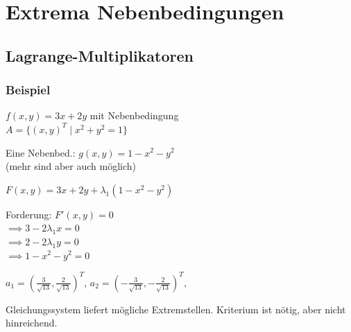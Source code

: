 \section*{Extrema Nebenbedingungen}

\subsection*{Lagrange-Multiplikatoren}
\subsubsection*{Beispiel}
$f(x,y) = 3x+2y$ mit Nebenbedingung \\
$A = \{(x,y)^T \mid x^2 + y^2 = 1\}$

Eine Nebenbed.: $g(x,y)=1-x^2-y^2$ \\
(mehr sind aber auch möglich)

$F(x,y) = 3x + 2y + \lambda_1(1-x^2-y^2)$

Forderung: $F'(x,y) = 0$ \\
$\implies 3-2\lambda_1x = 0$ \\
$\implies 2-2\lambda_1y = 0$ \\
$\implies 1-x^2-y^2 = 0$

$a_1 = (\frac{3}{\sqrt{13}}, \frac{2}{\sqrt{13}})^T$,
$a_2 = (-\frac{3}{\sqrt{13}}, -\frac{2}{\sqrt{13}})^T$,

Gleichungssystem liefert mögliche Extremstellen.
Kriterium ist nötig, aber nicht hinreichend.
